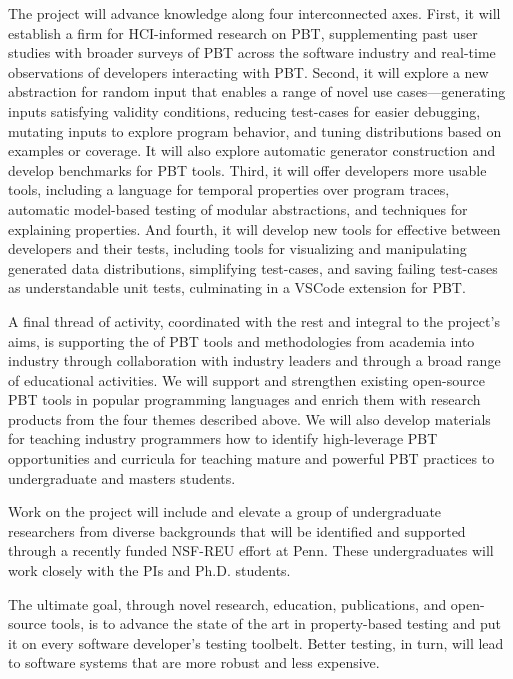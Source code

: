 The project will advance knowledge along four
interconnected axes.
%
First, it will establish a firm  for HCI-informed
research on PBT, supplementing past user studies with
broader surveys of PBT across the software industry and real-time
observations of developers interacting with PBT.
%
Second, it will explore a new abstraction for random input
 that enables a range of novel use
cases---generating inputs satisfying validity conditions, reducing
test-cases for easier debugging, mutating inputs to explore program
behavior, and tuning distributions based on examples or coverage. It
will also explore automatic generator construction and develop
benchmarks for PBT tools.
%
Third, it will offer developers more usable  tools,
including a language for temporal properties over program traces,
automatic model-based testing of
modular abstractions, and techniques for explaining properties.
%
And fourth, it will develop new tools for effective
 between developers and their tests, including
tools for visualizing and manipulating generated data
distributions, simplifying test-cases, and saving
  failing test-cases as understandable unit tests, culminating in a VSCode
  extension for PBT.  \iflater{}\fi

A final thread of activity, coordinated with the rest and integral to the
project's aims,
is supporting the  of PBT tools and
methodologies from academia into industry through collaboration with
industry leaders and through a broad range of educational activities.
We will support and strengthen existing
open-source PBT tools in popular programming languages and enrich them
with research products from the four
themes described above.
We will also
develop materials for teaching industry programmers how to identify
high-leverage PBT opportunities and curricula for teaching mature
and powerful PBT practices to undergraduate and masters students.

Work on the project will include and elevate a group of undergraduate
researchers from
diverse backgrounds that will be identified and supported through
a recently funded NSF-REU effort at Penn. These
undergraduates will work closely with the PIs and Ph.D.{} students.

The ultimate goal, through novel research, education, publications, and open-source
tools, is to advance the state of the art in property-based testing
and put it on every
software developer's testing toolbelt.  Better testing, in turn, will
lead to software systems that are more robust and less expensive.


